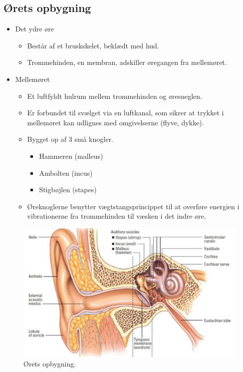 \subsection{Ørets opbygning}
\begin{itemize}
	\item Det ydre øre
	\begin{itemize}
		\item Består af et bruskskelet, beklædt med hud.
		\item Trommehinden, en membran, adskiller øregangen fra mellemøret.
	\end{itemize}
	\item Mellemøret
	\begin{itemize}
		\item Et luftfyldt hulrum mellem trommehinden og øresneglen.
		\item Er forbundet til svælget via en luftkanal, som sikrer at trykket i mellemøret kan udlignes med omgivelserne (flyve, dykke).
		\item Bygget op af 3 små knogler.
		\begin{itemize}
			\item Hammeren (malleus)
			\item Ambolten (incus)
			\item Stigbøjlen (stapes)
		\end{itemize}
		\item Øreknoglerne benytter vægtstangsprincippet til at overføre energien i vibrationerne fra trommehinden til væsken i det indre øre.
	\end{itemize}
\end{itemize}

\begin{figure} [H]
	\centering
	\includegraphics[width=\linewidth]{graphics/41.png}
	\caption{Ørets opbygning.}
	\label{fig:41}
\end{figure}

